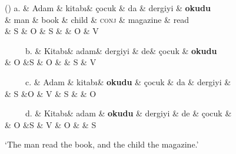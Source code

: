 \documentclass[lucida,biblatex]{sp} %
\newcounter{excounter}
\begin{document}
\begin{center}
  \footnotesize
  \label{ex:tr-gap-1}
  \begin{dependency}[edge unit distance=2.5ex]
    \begin{deptext}
     (\theexcounter) 
     a. \& Adam \& kitab\i \& \c{c}ocuk  \& da \& dergiyi \& \textbf{okudu} \\
     \& man  \& book \&  child \& \textsc{conj} \& magazine \& read \\
     \&  S \& O \& S \&  \& O \& V  \\
    \end{deptext}
  \end{dependency}
  
  \begin{dependency}[edge unit distance=2.5ex]
    \begin{deptext}[column sep=0.1cm]
     \ \ \ \ \ b. \& Kitab\i \&  adam\& dergiyi \& de\&  \c{c}ocuk  \& \textbf{okudu} \\
     \&  O \&S \& O \&  \& S \& V  \\
    \end{deptext}
  \end{dependency}
  
  \begin{dependency}
    \begin{deptext}[column sep=0.1cm]
      \ \ \ \ \ c. \& Adam \&  kitab\i  \& \textbf{okudu} \&  \c{c}ocuk  \&  da \& dergiyi \&   \\
     \&  S \&O \& V \& S \&  \& O  \\
    \end{deptext}
  \end{dependency}

  \begin{dependency}[edge unit distance=2.5ex]
    \begin{deptext}[column sep=0.1cm]
      \ \ \ \ \ d. \& Kitab\i   \& adam  \& \textbf{okudu} \& dergiyi   \&  de \& \c{c}ocuk  \&   \\
      \&  O \&S \& V \& O \&  \& S  \\
    \end{deptext}
  \end{dependency}
  \trans `The man read the book, and the child the magazine.'  \\ \normalsize \null \hfill \citep{Bozsahin2000}
\end{center}
\end{document}

